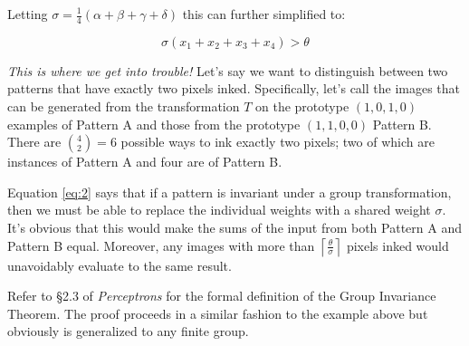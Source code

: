 \documentclass[11pt]{article}
\theoremstyle{definition}
\theoremstyle{theorem}
\begin{document}
Letting $\sigma = \frac{1}{4}(\alpha + \beta + \gamma + \delta)$ this can further simplified to:

\begin{equation}
\label{eq:2}
\sigma(x_1 + x_2 + x_3 + x_4) > \theta	
\end{equation}

\textit{This is where we get into trouble!} Let's say we want to distinguish between two patterns that have exactly two pixels inked. Specifically, let's call the images that can be generated from the transformation $T$ on the prototype $(1,0,1,0)$ examples of Pattern A and those from the prototype $(1,1,0,0)$ Pattern B. There are $\binom{4}{2} = 6$ possible ways to ink exactly two pixels; two of which are instances of Pattern A and four are of Pattern B.

Equation \ref{eq:2} says that if a pattern is invariant under a group transformation, then we must be able to replace the individual weights with a shared weight $\sigma$. It's obvious that this would make the sums of the input from both Pattern A and Pattern B equal. Moreover, any images with more than $\left \lceil \frac{\theta}{\sigma} \right \rceil$ pixels inked would unavoidably evaluate to the same result.

Refer to \S2.3 of \textit{Perceptrons} for the formal definition of the Group Invariance Theorem. The proof proceeds in a similar fashion to the example above but obviously is generalized to any finite group.



\end{document}
